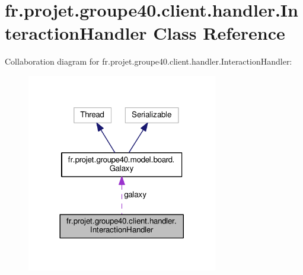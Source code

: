\hypertarget{classfr_1_1projet_1_1groupe40_1_1client_1_1handler_1_1_interaction_handler}{}\section{fr.\+projet.\+groupe40.\+client.\+handler.\+Interaction\+Handler Class Reference}
\label{classfr_1_1projet_1_1groupe40_1_1client_1_1handler_1_1_interaction_handler}


Collaboration diagram for fr.\+projet.\+groupe40.\+client.\+handler.\+Interaction\+Handler\+:\nopagebreak
\begin{figure}[H]
\begin{center}
\leavevmode
\includegraphics[width=236pt]{classfr_1_1projet_1_1groupe40_1_1client_1_1handler_1_1_interaction_handler__coll__graph}
\end{center}
\end{figure}
